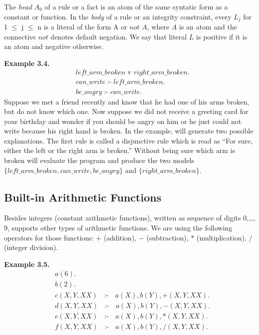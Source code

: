 \documentclass[14pt,a4paper, titlepage]{article}
\DeclareMathOperator{\leftimpl}{:-}
\begin{document}
The \emph{head} $A_0$ of a rule or a fact is an atom of the same syntatic form as a constant or function. In the \emph{body} of a rule or an integrity constraint, every $L_j$ for 1 $\leq$ j $\leq$ n is a literal of the form A or $\mathit{not}$ \text{}$A$, where $A$ is an atom and the connective $\mathit{not}$ denotes default negation. We say that literal $L$ is positive if it is an atom and negative otherwise. 

\textbf{Example 3.4.}
\begin{align*}
& \mathit{left\_arm\_broken} \text{ v } \mathit{right\_arm\_broken}.\\
& \mathit{can\_write} \leftimpl \mathit{left\_arm\_broken}.\\
& \mathit{be\_angry} \leftimpl \mathit{can\_write}.
\end{align*}
Suppose we met a friend recently and know that he had one of his arms broken, but do not know which one. Now suppose we did not receive a greeting card for your birthday and wonder if you should be angry on him or he just could not write because his right hand is broken. In the example, \dlvhex{} will generate two possible explanations. The first rule is called a disjunctive rule which is read as \enquote{For sure, either the left or the right arm is broken.} Without being sure which arm is broken \dlvhex{} will evaluate the program and produce the two models $\mathit{\{left\_arm\_broken, can\_write, be\_angry\}}$ and $\mathit{\{right\_arm\_broken\}}$.  

\subsection{Built-in Arithmetic Functions}
Besides integers (constant arithmetic functions), written as sequence of digits $0$,\dots,$9$, \dlvhex{} supports other types of arithmetic functions. We are using the following operators for those functions: $+$ (addition), $-$ (subtraction), $*$ (multiplication), $/$ (integer division). 

\textbf{Example 3.5.}
\begin{align*}
& \mathit{a}(6). \\
& \mathit{b}(2). \\
& c(X,Y,XX) \text{ } \leftimpl \text{ } a(X), b(Y),+(X, Y, XX). \\
& d(X,Y,XX) \text{ } \leftimpl \text{ } a(X), b(Y),-(X, Y, XX). \\
& e(X,Y,XX) \text{ } \leftimpl \text{ } a(X), b(Y),*(X, Y, XX). \\
& f(X,Y,XX) \text{ } \leftimpl \text{ } a(X), b(Y),/(X, Y, XX).
\end{align*}
\end{document}
